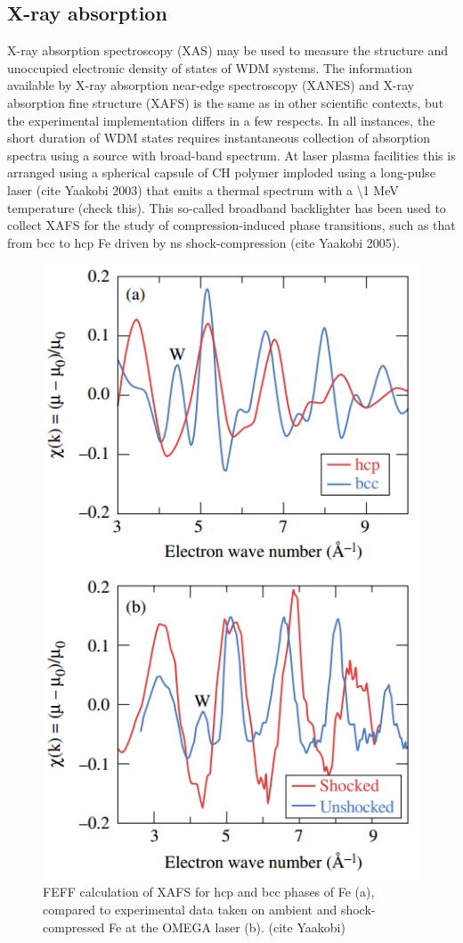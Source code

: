\documentclass [11pt, proquest, article] {uwthesis}[2016/11/22]
\begin{document}
\subsection{X-ray absorption}
X-ray absorption spectroscopy (XAS) may be used to measure the structure and unoccupied electronic density of states of WDM systems. The information available by X-ray absorption near-edge spectroscopy (XANES) and X-ray absorption fine structure (XAFS) is the same as in other scientific contexts, but the experimental implementation differs in a few respects. In all instances, the short duration of WDM states requires instantaneous collection of absorption spectra using a source with broad-band spectrum. At laser plasma facilities this is arranged using a spherical capsule of CH polymer imploded using a long-pulse laser (cite Yaakobi 2003) that emits a thermal spectrum with a \textbackslash 1 MeV temperature (check this). This so-called broadband backlighter has been used to collect XAFS for the study of compression-induced phase transitions, such as that from bcc to hcp Fe driven by ns shock-compression (cite Yaakobi 2005).

\begin{figure}[h] 
\caption{FEFF calculation of XAFS for hcp and bcc phases of Fe (a), compared to experimental data taken on ambient and shock-compressed Fe at the OMEGA laser (b). (cite Yaakobi)}
\label{fig:xafs}
\centering
\includegraphics[scale=0.6]{../Figures/yaakobi_shock_xafs.png}
\end{figure}
\end{document}

